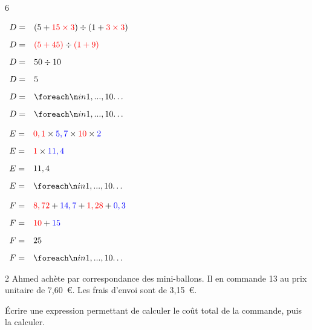 \documentclass[a4paper]{book}
\begin{document}
{\begin{exerciceNote}{6}
\begin{minipage}{0.35\linewidth}
            \bigskip

            $\begin{array}{ll}
                D = & (5+\textcolor{red}{15\times3})\div(1+\textcolor{red}{3\times3}) \\[2ex]
                D = & \textcolor{red}{(5+45)}\div\textcolor{red}{(1+9)}\\[2ex]
                D = & 50\div10\\[2ex]
                D = & 5\\[2ex]
                D = & \points[10]\\[2ex]
                D = & \points[10]
            \end{array}$
        \end{minipage}
        \vline
        \begin{minipage}{0.3\linewidth}
            $\begin{array}{ll}
                E = & \textcolor{red}{0,1}\times \textcolor{blue}{5,7} \times \textcolor{red}{10} \times \textcolor{blue}{2} \\[2ex]
                E = & \textcolor{red}{1}\times\textcolor{blue}{11,4}\\[2ex]
                E = & 11,4\\[2ex]
                E = & \points[10]
            \end{array}$

            \bigskip

            $\begin{array}{ll}
                F = & \textcolor{red}{8,72} + \textcolor{blue}{14,7} + \textcolor{red}{1,28} + \textcolor{blue}{0,3} \\[2ex]
                F = & \textcolor{red}{10}+\textcolor{blue}{15}\\[2ex]
                F = & 25\\[2ex]
                F = & \points[10]
            \end{array}$
        \end{minipage}
    \end{exerciceNote}


    \begin{exerciceNote}{2}
        Ahmed achète par correspondance des mini-ballons. Il en commande 13 au prix unitaire de 7,60~\euro. Les frais d'envoi sont de 3,15~\euro.
        
        Écrire une expression permettant de calculer le coût total de la commande, puis la calculer. 


\end{exerciceNote}}
\end{document}
